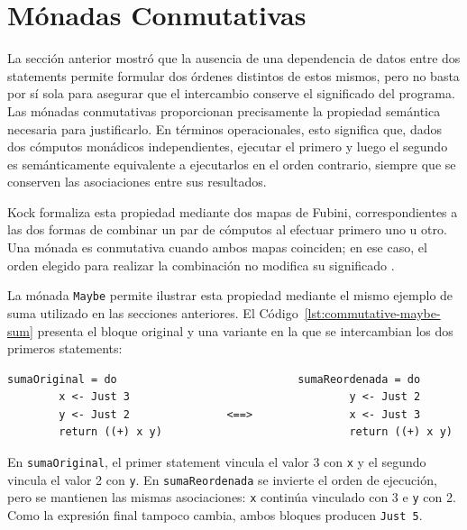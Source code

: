 
\section{Mónadas Conmutativas}
\label{sec:monadas-conmutativas}

La sección anterior mostró que la ausencia de una dependencia de datos entre dos statements permite formular dos órdenes distintos de estos mismos, pero no basta por sí sola para asegurar que el intercambio conserve el significado del programa. Las mónadas conmutativas proporcionan precisamente la propiedad semántica necesaria para justificarlo. En términos operacionales, esto significa que, dados dos cómputos monádicos independientes, ejecutar el primero y luego el segundo es semánticamente equivalente a ejecutarlos en el orden contrario, siempre que se conserven las asociaciones entre sus resultados.

Kock formaliza esta propiedad mediante dos mapas de Fubini, correspondientes a las dos formas de combinar un par de cómputos al efectuar primero uno u otro. Una mónada es conmutativa cuando ambos mapas coinciden; en ese caso, el orden elegido para realizar la combinación no modifica su significado \cite[secciones~5 y~9]{Kock2012}.

La mónada \texttt{Maybe} permite ilustrar esta propiedad mediante el mismo ejemplo de suma utilizado en las secciones anteriores. El Código~\ref{lst:commutative-maybe-sum} presenta el bloque original y una variante en la que se intercambian los dos primeros statements:

\noindent\begin{minipage}{\textwidth}
\begin{lstlisting}[style=haskell,caption={Suma monádica sobre \texttt{Maybe} en el orden original y según un reordenamiento válido.},label={lst:commutative-maybe-sum}]
    sumaOriginal = do                            sumaReordenada = do  
        x <- Just 3                                  y <- Just 2
        y <- Just 2               <==>               x <- Just 3
        return ((+) x y)                             return ((+) x y)
\end{lstlisting}
\end{minipage}

En \texttt{sumaOriginal}, el primer statement vincula el valor 3 con \texttt{x} y el segundo vincula el valor 2 con \texttt{y}. En \texttt{sumaReordenada} se invierte el orden de ejecución, pero se mantienen las mismas asociaciones: \texttt{x} continúa vinculado con 3 e \texttt{y} con 2. Como la expresión final tampoco cambia, ambos bloques producen \texttt{Just 5}.

